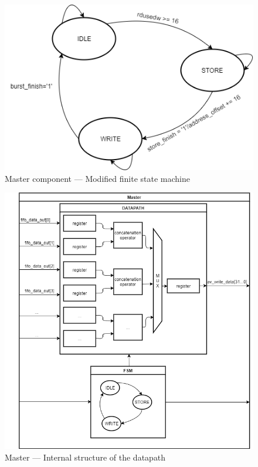 \documentclass{article}
\begin{document}
\begin{figure}[H]
\centering
\includegraphics[scale=0.45]{images/MasterFSM.png}
\caption{Master component --- Modified finite state machine}
\label{fig:MasterFSM}
\end{figure}

\begin{figure}[H]
\centering
\includegraphics[scale=0.6]{images/MasterInside.png}
\caption{Master --- Internal structure of the datapath}
\label{fig:MasterInside}
\end{figure}
\end{document}
